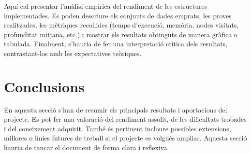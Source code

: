 Aquí cal presentar l’anàlisi empírica del rendiment de les estructures implementades. Es poden descriure els conjunts de dades emprats, les proves realitzades, les mètriques recollides (temps d’execució, memòria, nodes visitats, profunditat mitjana, etc.) i mostrar els resultats obtinguts de manera gràfica o tabulada. Finalment, s’hauria de fer una interpretació crítica dels resultats, contrastant-los amb les expectatives teòriques.

\section{Conclusions}

En aquesta secció s’han de resumir els principals resultats i aportacions del projecte. Es pot fer una valoració del rendiment assolit, de les dificultats trobades i del coneixement adquirit. També és pertinent incloure possibles extensions, millores o línies futures de treball si el projecte es volgués ampliar. Aquesta secció hauria de tancar el document de forma clara i reflexiva.
